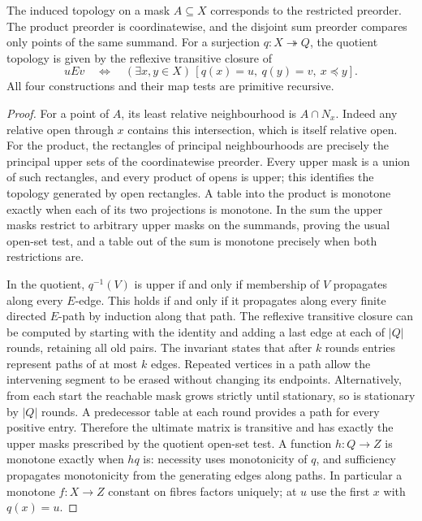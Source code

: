 \begin{theorem}\label{idx-finite273}
The induced topology on a mask $A\subseteq X$ corresponds to the restricted
preorder. The product preorder is coordinatewise, and the disjoint sum
preorder compares only points of the same summand. For a surjection
$q:X\twoheadrightarrow Q$, the quotient topology is given by the reflexive
transitive closure of
\[
 uEv\quad\Longleftrightarrow\quad
 (\exists x,y\in X)\,[q(x)=u,\ q(y)=v,\ x\preceq y].
\]
All four constructions and their map tests are primitive recursive.
\end{theorem}
\begin{proof}
For a point of $A$, its least relative neighbourhood is $A\cap N_x$.
Indeed any relative open through $x$ contains this intersection, which
is itself relative open. For the product, the rectangles of principal
neighbourhoods are precisely the principal upper sets of the coordinatewise
preorder. Every upper mask is a union of such rectangles, and every product
of opens is upper; this identifies the topology generated by open rectangles.
A table into the product is monotone exactly when each of its two projections
is monotone. In the sum the upper masks restrict to arbitrary upper masks
on the summands, proving the usual open-set test, and a table out of the
sum is monotone precisely when both restrictions are.

In the quotient, $q^{-1}(V)$ is upper if and only if membership of $V$
propagates along every $E$-edge. This holds if and only if it propagates
along every finite directed $E$-path by induction along that path. The
reflexive transitive closure can be computed by starting with the identity
and adding a last edge at each of $|Q|$ rounds, retaining all old pairs.
The invariant states that after $k$ rounds entries represent paths of
at most $k$ edges. Repeated vertices in a path allow the intervening
segment to be erased without changing its endpoints. Alternatively,
from each start the reachable mask grows strictly until stationary, so is
stationary by $|Q|$ rounds. A predecessor table at each round provides a
path for every positive entry. Therefore the ultimate matrix is transitive
and has exactly the upper masks prescribed by the quotient open-set test.
A function $h:Q\to Z$ is monotone exactly when $hq$ is: necessity uses
monotonicity of $q$, and sufficiency propagates monotonicity from the
generating edges along paths. In particular a monotone $f:X\to Z$ constant
on fibres factors uniquely; at $u$ use the first $x$ with $q(x)=u$.
\end{proof}

